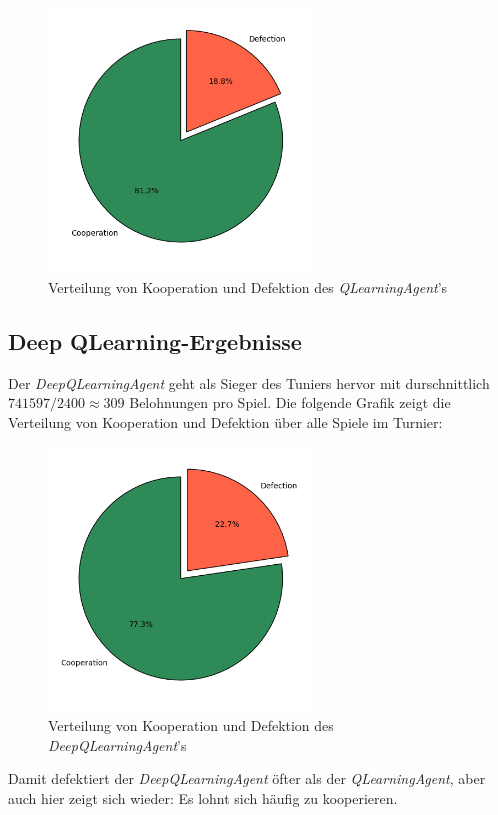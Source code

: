 \begin{figure}[H]
    \centering
    \includegraphics[width=7cm]{../poster/logos/qPie.png}
    \caption{Verteilung von Kooperation und Defektion des \textit{QLearningAgent}'s}
    \label{fig:qverteilung}
\end{figure}

\subsection{Deep QLearning-Ergebnisse}
Der \textit{DeepQLearningAgent} geht als Sieger des Tuniers hervor mit durschnittlich $741597 / 2400 \approx 309$ Belohnungen pro Spiel. 
Die folgende Grafik zeigt die Verteilung von Kooperation und Defektion über alle Spiele im Turnier:
\begin{figure}[H]
    \centering
    \includegraphics[width=7cm]{../poster/logos/deepqPie.png}
    \caption{Verteilung von Kooperation und Defektion des \textit{DeepQLearningAgent}'s}
    \label{fig:deepqverteilung}
\end{figure}
Damit defektiert der \textit{DeepQLearningAgent} öfter als der \textit{QLearningAgent}, aber auch hier zeigt sich wieder: Es lohnt sich 
häufig zu kooperieren. 

